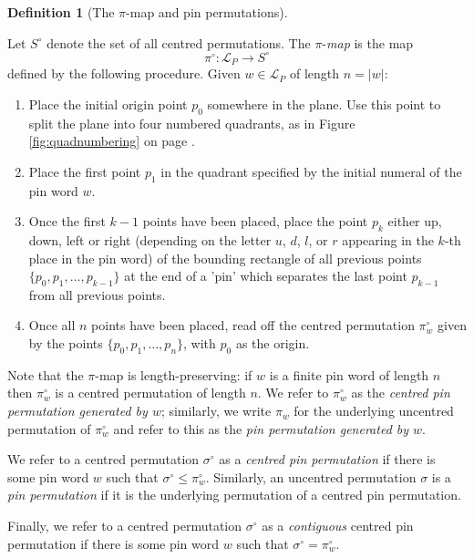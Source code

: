 \documentclass[11pt,a4paper]{article}
\theoremstyle{definition}
\newtheorem{defn}[thm]{Definition}
\begin{document}
\begin{defn}[The $\pi$-map and pin permutations] \label{def:pimap}

Let $S^{\circ}$ denote the set of all centred permutations. The $\pi$-\emph{map} is the map
\[
\pi^{\circ}: \mathcal{L}_{P} \rightarrow S^{\circ}
\]
defined by the following procedure. Given $w \in \mathcal{L}_{P}$ of length $n=|w|$:

\begin{enumerate}
\item Place the initial origin point $p_{0}$ somewhere in the plane. Use this point to split the plane into four numbered quadrants, as in Figure \ref{fig:quadnumbering} on page \pageref{fig:quadnumbering}.
\item Place the first point $p_{1}$ in the quadrant specified by the initial numeral of the pin word $w$.
\item Once the first $k-1$ points have been placed, place the point $p_{k}$ either up, down, left or right (depending on the letter $u$, $d$, $l$, or $r$ appearing in the $k$-th place in the pin word) of the bounding rectangle of all previous points $\{p_{0},p_{1}, \dots , p_{k-1} \}$ at the end of a 'pin' which separates the last point $p_{k-1}$ from all previous points.
\item Once all $n$ points have been placed, read off the centred permutation $\pi^{\circ}_{w}$ given by the points  $\{p_{0}, p_{1}, \dots , p_{n} \}$, with $p_{0}$ as the origin.
\end{enumerate}

Note that the $\pi$-map is length-preserving: if $w$ is a finite pin word of length $n$ then $\pi^{\circ}_{w}$ is a centred permutation of length $n$. We refer to $\pi^{\circ}_{w}$ as the \emph{centred pin permutation generated by $w$}; similarly, we write $\pi_{w}$ for the underlying uncentred permutation of $\pi^{\circ}_{w}$ and refer to this as the \emph{pin permutation generated by $w$}.

We refer to a centred permutation $\sigma^{\circ}$ as a \emph{centred pin permutation} if there is some pin word $w$ such that $\sigma^{\circ} \leq \pi^{\circ}_{w}$. Similarly, an uncentred permutation $\sigma$ is a \emph{pin permutation} if it is the underlying permutation of a centred pin permutation.

Finally, we refer to a centred permutation $\sigma^{\circ}$ as a \emph{contiguous} centred pin permutation if there is some pin word $w$ such that $\sigma^{\circ} = \pi^{\circ}_{w}$.

\end{defn}
\end{document}
